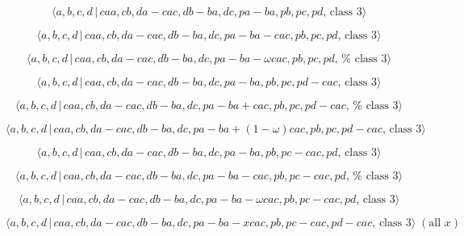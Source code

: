 \documentclass[10pt]{article}
\begin{document}
\begin{equation}
\langle a,b,c,d\,|\,caa,cb,da-cac,db-ba,dc,pa-ba,pb,pc,pd,\,\text{class }%
3\rangle  \tag{7.4136}
\end{equation}

\begin{equation}
\langle a,b,c,d\,|\,caa,cb,da-cac,db-ba,dc,pa-ba-cac,pb,pc,pd,\,\text{class }%
3\rangle  \tag{7.4137}
\end{equation}

\begin{equation}
\langle a,b,c,d\,|\,caa,cb,da-cac,db-ba,dc,pa-ba-\omega cac,pb,pc,pd,\,\text{%
class }3\rangle  \tag{7.4138}
\end{equation}

\begin{equation}
\langle a,b,c,d\,|\,caa,cb,da-cac,db-ba,dc,pa-ba,pb,pc,pd-cac,\,\text{class }%
3\rangle  \tag{7.4139}
\end{equation}

\begin{equation}
\langle a,b,c,d\,|\,caa,cb,da-cac,db-ba,dc,pa-ba+cac,pb,pc,pd-cac,\,\text{%
class }3\rangle  \tag{7.4140}
\end{equation}

\begin{equation}
\langle a,b,c,d\,|\,caa,cb,da-cac,db-ba,dc,pa-ba+(1-\omega
)cac,pb,pc,pd-cac,\,\text{class }3\rangle  \tag{7.4141}
\end{equation}

\begin{equation}
\langle a,b,c,d\,|\,caa,cb,da-cac,db-ba,dc,pa-ba,pb,pc-cac,pd,\,\text{class }%
3\rangle  \tag{7.4142}
\end{equation}

\begin{equation}
\langle a,b,c,d\,|\,caa,cb,da-cac,db-ba,dc,pa-ba-cac,pb,pc-cac,pd,\,\text{%
class }3\rangle  \tag{7.4143}
\end{equation}

\begin{equation}
\langle a,b,c,d\,|\,caa,cb,da-cac,db-ba,dc,pa-ba-\omega cac,pb,pc-cac,pd,\,%
\text{class }3\rangle  \tag{7.4144}
\end{equation}

\begin{equation}
\langle a,b,c,d\,|\,caa,cb,da-cac,db-ba,dc,pa-ba-xcac,pb,pc-cac,pd-cac,\,%
\text{class }3\rangle \;(\text{all }x)  \tag{7.4145}
\end{equation}
\end{document}
